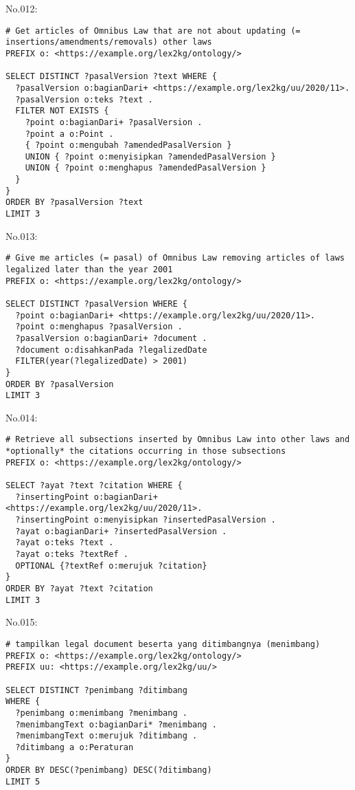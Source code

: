 \noindent No.012:
\begin{lstlisting}
# Get articles of Omnibus Law that are not about updating (= insertions/amendments/removals) other laws
PREFIX o: <https://example.org/lex2kg/ontology/>

SELECT DISTINCT ?pasalVersion ?text WHERE {
  ?pasalVersion o:bagianDari+ <https://example.org/lex2kg/uu/2020/11>.
  ?pasalVersion o:teks ?text .
  FILTER NOT EXISTS {
    ?point o:bagianDari+ ?pasalVersion . 
    ?point a o:Point .
    { ?point o:mengubah ?amendedPasalVersion }
    UNION { ?point o:menyisipkan ?amendedPasalVersion } 
    UNION { ?point o:menghapus ?amendedPasalVersion }
  }
}
ORDER BY ?pasalVersion ?text
LIMIT 3
\end{lstlisting}


\noindent No.013:
\begin{lstlisting}
# Give me articles (= pasal) of Omnibus Law removing articles of laws legalized later than the year 2001
PREFIX o: <https://example.org/lex2kg/ontology/>

SELECT DISTINCT ?pasalVersion WHERE {
  ?point o:bagianDari+ <https://example.org/lex2kg/uu/2020/11>.
  ?point o:menghapus ?pasalVersion .
  ?pasalVersion o:bagianDari+ ?document .
  ?document o:disahkanPada ?legalizedDate
  FILTER(year(?legalizedDate) > 2001)
}
ORDER BY ?pasalVersion
LIMIT 3
\end{lstlisting}


\noindent No.014:
\begin{lstlisting}
# Retrieve all subsections inserted by Omnibus Law into other laws and *optionally* the citations occurring in those subsections
PREFIX o: <https://example.org/lex2kg/ontology/>

SELECT ?ayat ?text ?citation WHERE {
  ?insertingPoint o:bagianDari+ <https://example.org/lex2kg/uu/2020/11>.
  ?insertingPoint o:menyisipkan ?insertedPasalVersion .
  ?ayat o:bagianDari+ ?insertedPasalVersion .
  ?ayat o:teks ?text .
  ?ayat o:teks ?textRef .
  OPTIONAL {?textRef o:merujuk ?citation}
}
ORDER BY ?ayat ?text ?citation
LIMIT 3
\end{lstlisting}


\noindent No.015:
\begin{lstlisting}
# tampilkan legal document beserta yang ditimbangnya (menimbang)
PREFIX o: <https://example.org/lex2kg/ontology/>
PREFIX uu: <https://example.org/lex2kg/uu/>

SELECT DISTINCT ?penimbang ?ditimbang
WHERE {
  ?penimbang o:menimbang ?menimbang .
  ?menimbangText o:bagianDari* ?menimbang .
  ?menimbangText o:merujuk ?ditimbang .
  ?ditimbang a o:Peraturan
}
ORDER BY DESC(?penimbang) DESC(?ditimbang)
LIMIT 5
\end{lstlisting}


